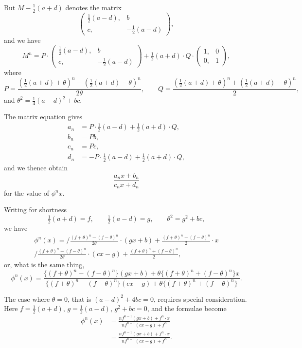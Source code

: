 \documentclass[11pt,a4paper]{book}
\begin{document}
But $M - \tfrac{1}{2}(a+d)$ denotes the matrix
%
\[
\left(\begin{array}{c|c}
\tfrac{1}{2}(a-d), & b \\[4pt]
c, & -\tfrac{1}{2}(a-d)
\end{array}\right),
\]
%
and we have
%
\[
M^n = P \cdot \left(\begin{array}{c|c}
\tfrac{1}{2}(a-d), & b \\[4pt]
c, & -\tfrac{1}{2}(a-d)
\end{array}\right)
+ \tfrac{1}{2}(a+d) \cdot Q \cdot
\left(\begin{array}{c|c} 1, & 0 \\ \hline 0, & 1 \end{array}\right),
\]
%
where
%
\[
P = \frac{(\tfrac{1}{2}(a+d) + \theta)^n - (\tfrac{1}{2}(a+d) - \theta)^n}{2\theta},
\qquad
Q = \frac{(\tfrac{1}{2}(a+d) + \theta)^n + (\tfrac{1}{2}(a+d) - \theta)^n}{2},
\]
%
and $\theta^2 = \tfrac{1}{4}(a-d)^2 + bc$.

The matrix equation gives
\begin{align*}
a_n &= P \cdot \tfrac{1}{2}(a-d) + \tfrac{1}{2}(a+d) \cdot Q, \\
b_n &= Pb, \\
c_n &= Pc, \\
d_n &= -P \cdot \tfrac{1}{2}(a-d) + \tfrac{1}{2}(a+d) \cdot Q,
\end{align*}
%
and we thence obtain
%
\[
\frac{a_n x + b_n}{c_n x + d_n}
\]
%
for the value of $\phi^n x$.

Writing for shortness
%
\[
\tfrac{1}{2}(a+d) = f, \qquad \tfrac{1}{2}(a-d) = g, \qquad \theta^2 = g^2 + bc,
\]
%
we have
%
\begin{multline*}
\phi^n(x) = \bigg/
\frac{(f+\theta)^n - (f-\theta)^n}{2\theta} \cdot (gx+b)
+ \frac{(f+\theta)^n + (f-\theta)^n}{2} \cdot x \\
\bigg/ \frac{(f+\theta)^n - (f-\theta)^n}{2\theta} \cdot (cx-g)
+ \frac{(f+\theta)^n + (f-\theta)^n}{2},
\end{multline*}
%
or, what is the same thing,
%
\[
\phi^n(x) = \frac{\{(f+\theta)^n - (f-\theta)^n\}(gx+b)
+ \theta\{(f+\theta)^n + (f-\theta)^n\}x}
{\{(f+\theta)^n - (f-\theta)^n\}(cx-g)
+ \theta\{(f+\theta)^n + (f-\theta)^n\}}.
\]

The case where $\theta = 0$, that is $(a-d)^2 + 4bc = 0$, requires special consideration.
Here $f = \tfrac{1}{2}(a+d)$, $g = \tfrac{1}{2}(a-d)$, $g^2 + bc = 0$, and the formulae become
%
\begin{align*}
\phi^n(x) &= \frac{nf^{n-1}(gx+b) + f^n \cdot x}{nf^{n-1}(cx-g) + f^n} \\
&= \frac{nf^{n-1}(gx+b) + f^n \cdot x}{nf^{n-1}(cx-g) + f^n}.
\end{align*}
\end{document}
